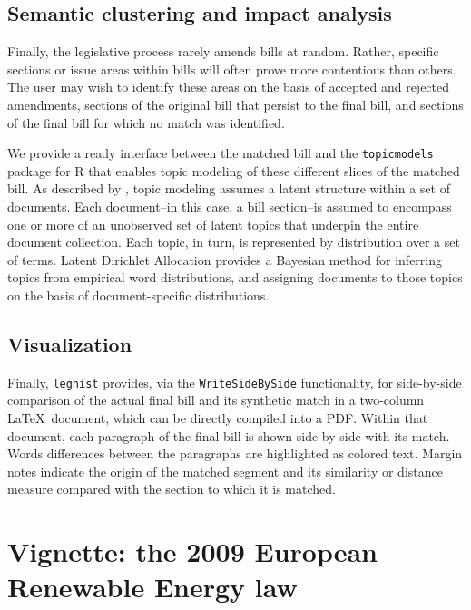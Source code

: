 \documentclass[11pt]{article}
\begin{document}
\subsection{Semantic clustering and impact analysis}
\label{sec:semant-clust-impact}

Finally, the legislative process rarely amends bills at
random. Rather, specific sections or issue areas within bills will
often prove more contentious than others. The user may wish to
identify these areas on the basis of accepted and rejected amendments,
sections of the original bill that persist to the final bill, and
sections of the final bill for which no match was identified. 

We provide a ready interface between the matched bill and the
\texttt{topicmodels} package for R that enables topic modeling of
these different slices of the matched bill. As described by
\cite{blei2003latent}, topic modeling assumes a latent
structure within a set of documents. Each document--in this case, a
bill section--is assumed to encompass one or more of an unobserved set
of latent topics that underpin the entire document collection. Each
topic, in turn, is represented by distribution over a
set of terms. Latent Dirichlet Allocation provides a Bayesian method
for inferring topics from empirical word distributions, and assigning
documents to those topics on the basis of document-specific
distributions. 

\subsection{Visualization}
\label{sec:visualization}

Finally, \texttt{leghist} provides, via the \texttt{WriteSideBySide}
functionality, for side-by-side comparison of the actual final
bill and its synthetic match in a two-column \LaTeX\ document, which
can be directly compiled into a PDF. Within that document, each
paragraph of the final bill is shown side-by-side with its
match. Words differences between the paragraphs are highlighted as
colored text. Margin notes indicate the origin of the matched segment
and its similarity or distance measure compared with the section to
which it is matched.


\section{Vignette: the 2009 European Renewable Energy law }
\label{sec:vign-2009-europ}
\end{document}
